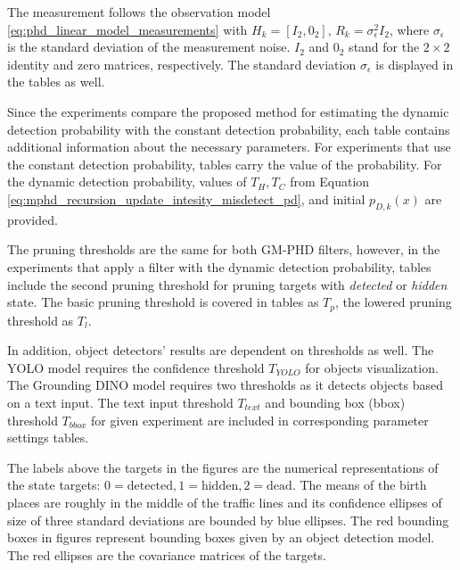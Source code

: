 The measurement follows the observation model \eqref{eq:phd_linear_model_measurements} with $H_k = [I_2, 0_2]$, $R_k
= \sigma_{\epsilon}^2I_2$, where $ \sigma_{\epsilon}$ is the standard deviation of the measurement noise.  $I_2$ and $0_2$ stand for
the $2\times 2$ identity and zero matrices, respectively.
The standard deviation $\sigma_{\epsilon}$ is displayed in the tables as well.

Since the experiments compare the proposed method for estimating the dynamic detection probability with the constant
detection probability, each table contains additional information about the necessary parameters. For experiments that
use the constant
detection probability, tables carry the value of the probability. For the dynamic detection probability, values of $T_H, T_C$
from Equation \eqref{eq:mphd_recursion_update_intesity_misdetect_pd},
and initial $p_{D,k}(x)$ are provided.

The pruning thresholds are the same for both GM-PHD filters, however, in the experiments that apply a filter with the
dynamic detection probability, tables
include the second pruning threshold for pruning targets with \textit{detected} or \textit{hidden} state. The basic
pruning threshold is covered in tables as $T_p$, the lowered pruning threshold as $T_l$.

In addition, object detectors' results are dependent on thresholds as well. The YOLO model requires the confidence
threshold $T_{YOLO}$ for objects visualization. The Grounding DINO model requires two thresholds as it detects objects based on a text input. The text input threshold $T_{text}$ and bounding box (bbox) threshold $T_{bbox}$ for given experiment are included in corresponding parameter settings tables.

The labels above
the targets in the figures are the numerical representations of the state targets: $0=\text{detected}, 1=\text{hidden}, 2=\text{dead}$. The means of the birth places are roughly in the middle of the traffic lines and its confidence ellipses of size of
three standard
deviations are bounded by blue ellipses. The red bounding boxes in figures represent bounding
boxes given by an object detection model. The red ellipses are the covariance matrices of the targets.
















